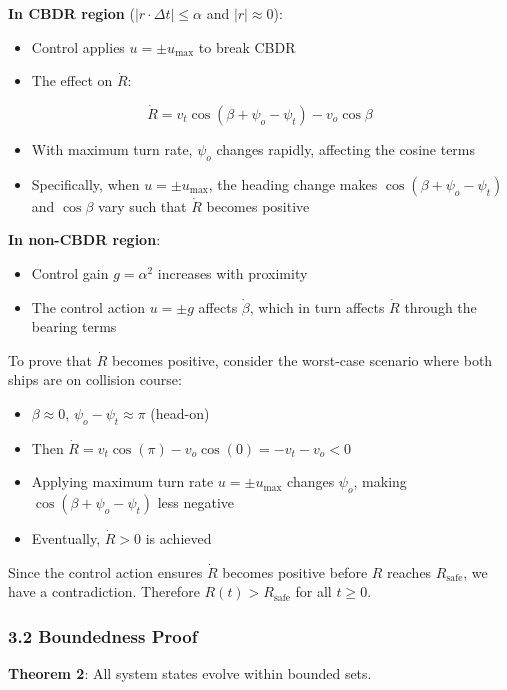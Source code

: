 \documentclass[11pt,a4paper]{article}
\numberwithin{equation}{section}
\begin{document}
\textbf{In CBDR region} ($|r \cdot \Delta t| \leq \alpha$ and $|r| \approx 0$):
\begin{itemize}
\item Control applies $u = \pm u_{\max}$ to break CBDR
\item The effect on $\dot{R}$:
\end{itemize}

\[
\dot{R} = v_t\cos(\beta + \psi_o - \psi_t) - v_o\cos\beta
\]

\begin{itemize}
\item With maximum turn rate, $\psi_o$ changes rapidly, affecting the cosine terms
\item Specifically, when $u = \pm u_{\max}$, the heading change makes $\cos(\beta + \psi_o - \psi_t)$ and $\cos\beta$ vary such that $\dot{R}$ becomes positive
\end{itemize}

\textbf{In non-CBDR region}:
\begin{itemize}
\item Control gain $g = \alpha^2$ increases with proximity
\item The control action $u = \pm g$ affects $\dot{\beta}$, which in turn affects $\dot{R}$ through the bearing terms
\end{itemize}

To prove that $\dot{R}$ becomes positive, consider the worst-case scenario where both ships are on collision course:
\begin{itemize}
\item $\beta \approx 0$, $\psi_o - \psi_t \approx \pi$ (head-on)
\item Then $\dot{R} = v_t\cos(\pi) - v_o\cos(0) = -v_t - v_o < 0$
\item Applying maximum turn rate $u = \pm u_{\max}$ changes $\psi_o$, making $\cos(\beta + \psi_o - \psi_t)$ less negative
\item Eventually, $\dot{R} > 0$ is achieved
\end{itemize}

Since the control action ensures $\dot{R}$ becomes positive before $R$ reaches $R_{\text{safe}}$, we have a contradiction. Therefore $R(t) > R_{\text{safe}}$ for all $t \geq 0$.

\subsubsection{3.2 Boundedness Proof}

\textbf{Theorem 2}: All system states evolve within bounded sets.
\end{document}
